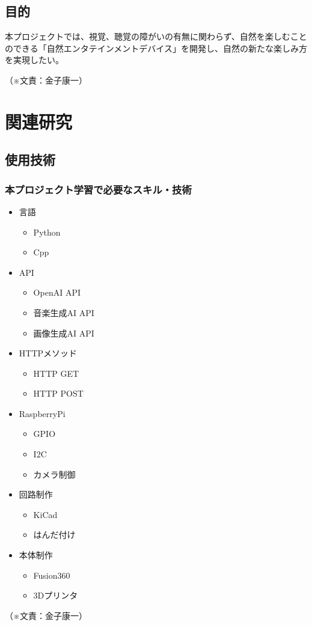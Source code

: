 \documentclass[11pt,a4paper]{report}
\newcommand{\Writer}[1]{
  \normalsize
  \begin{flushright}
    （※文責：#1）
  \end{flushright}
}
\begin{document}
\section{目的}
\label{goal}
\noindent\space
本プロジェクトでは、視覚、聴覚の障がいの有無に関わらず、自然を楽しむことのできる「自然エンタテインメントデバイス」を開発し、自然の新たな楽しみ方を実現したい。
\Writer{金子康一}

\chapter{関連研究}
\section{使用技術}
\subsection{本プロジェクト学習で必要なスキル・技術}
\noindent\space
\begin{itemize}
  \item 言語
  \begin{itemize}
    \item Python
    \item Cpp
  \end{itemize}
  \item API
  \begin{itemize}
    \item OpenAI API
    \item 音楽生成AI API
    \item 画像生成AI API
  \end{itemize}
  \item HTTPメソッド
  \begin{itemize}
    \item HTTP GET
    \item HTTP POST
  \end{itemize}
  \item RaspberryPi
  \begin{itemize}
    \item GPIO
    \item I2C
    \item カメラ制御
  \end{itemize}
  \item 回路制作
  \begin{itemize}
    \item KiCad
    \item はんだ付け
  \end{itemize}
  \item 本体制作
  \begin{itemize}
    \item Fusion360
    \item 3Dプリンタ
  \end{itemize}
\end{itemize}
\Writer{金子康一}
\end{document}
